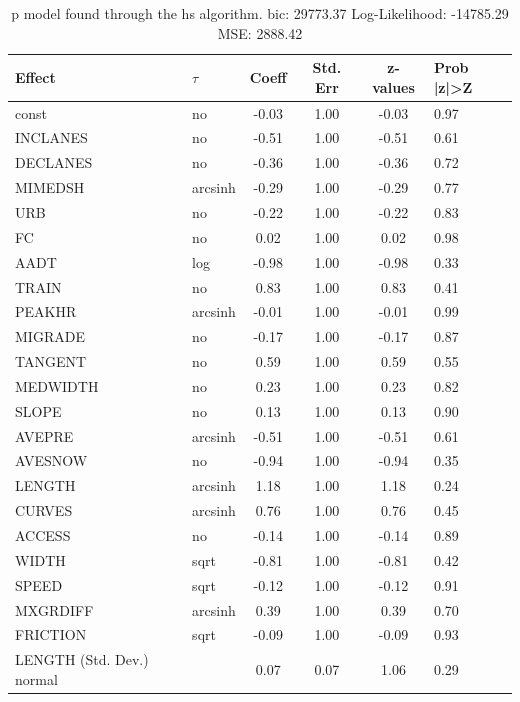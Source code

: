 \begin{table}
	\caption{p model found through the hs algorithm. bic: 29773.37 Log-Likelihood: -14785.29 MSE: 2888.42}
	\begin{center}
		\begin{tabular}{|l|l|c|c|c|l|}
			\hline
			Effect & $\tau$ & Coeff & Std. Err & z-values & Prob |z|>Z \\
			\hline
			const & no & -0.03 & 1.00 & -0.03 & 0.97 \\
			\hline
			INCLANES & no & -0.51 & 1.00 & -0.51 & 0.61 \\
			\hline
			DECLANES & no & -0.36 & 1.00 & -0.36 & 0.72 \\
			\hline
			MIMEDSH & arcsinh & -0.29 & 1.00 & -0.29 & 0.77 \\
			\hline
			URB & no & -0.22 & 1.00 & -0.22 & 0.83 \\
			\hline
			FC & no & 0.02 & 1.00 & 0.02 & 0.98 \\
			\hline
			AADT & log & -0.98 & 1.00 & -0.98 & 0.33 \\
			\hline
			TRAIN & no & 0.83 & 1.00 & 0.83 & 0.41 \\
			\hline
			PEAKHR & arcsinh & -0.01 & 1.00 & -0.01 & 0.99 \\
			\hline
			MIGRADE & no & -0.17 & 1.00 & -0.17 & 0.87 \\
			\hline
			TANGENT & no & 0.59 & 1.00 & 0.59 & 0.55 \\
			\hline
			MEDWIDTH & no & 0.23 & 1.00 & 0.23 & 0.82 \\
			\hline
			SLOPE & no & 0.13 & 1.00 & 0.13 & 0.90 \\
			\hline
			AVEPRE & arcsinh & -0.51 & 1.00 & -0.51 & 0.61 \\
			\hline
			AVESNOW & no & -0.94 & 1.00 & -0.94 & 0.35 \\
			\hline
			LENGTH & arcsinh & 1.18 & 1.00 & 1.18 & 0.24 \\
			\hline
			CURVES & arcsinh & 0.76 & 1.00 & 0.76 & 0.45 \\
			\hline
			ACCESS & no & -0.14 & 1.00 & -0.14 & 0.89 \\
			\hline
			WIDTH & sqrt & -0.81 & 1.00 & -0.81 & 0.42 \\
			\hline
			SPEED & sqrt & -0.12 & 1.00 & -0.12 & 0.91 \\
			\hline
			MXGRDIFF & arcsinh & 0.39 & 1.00 & 0.39 & 0.70 \\
			\hline
			FRICTION & sqrt & -0.09 & 1.00 & -0.09 & 0.93 \\
			\hline
			LENGTH (Std. Dev.) normal &  & 0.07 & 0.07 & 1.06 & 0.29 \\

\end{tabular}
\end{center}
\end{table}
